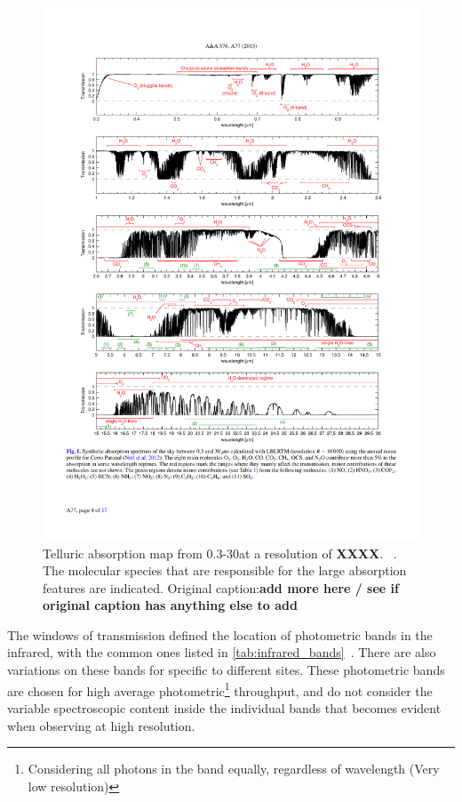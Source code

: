 \begin{figure}
    \centering
    \includegraphics[width=0.9\linewidth]{figures/atmos_and_models/cropped_molecfit_absorption}
    \caption{Telluric absorption map from 0.3-30\um at a resolution of \textbf{XXXX}. ~\citet[][Figure~1]{smette_molecfit_2015}. The molecular species that are responsible for the large absorption features are indicated.
        Original caption:\textbf{add more here / see if original caption has anything else to add}}
    \label{fig:croppedmolecfitabsorbtion}
\end{figure}

The windows of transmission defined the location of photometric bands in the infrared, with the common ones listed in \cref{tab:infrared_bands}~\citep[see e.g.][]{sterken_astronomical_1992, binney_galactic_1998}.
There are also variations on these bands for specific to different sites.
These photometric bands are chosen for high average photometric\footnote{Considering all photons in the band equally, regardless of wavelength (Very low resolution)} throughput, and do not consider the variable spectroscopic content inside the individual bands that becomes evident when observing at high resolution.

